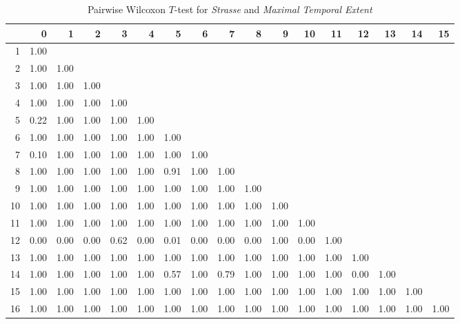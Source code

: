 \begin{table}[ht!]
	\tiny
	\setlength{\tabcolsep}{4pt}
	\centering
  \begin{tabular}{rrrrrrrrrrrrrrrrr}
    \hline
   & 0 & 1 & 2 & 3 & 4 & 5 & 6 & 7 & 8 & 9 & 10 & 11 & 12 & 13 & 14 & 15 \\ 
    \hline
  1 & 1.00 &  &  &  &  &  &  &  &  &  &  &  &  &  &  &  \\ 
    2 & 1.00 & 1.00 &  &  &  &  &  &  &  &  &  &  &  &  &  &  \\ 
    3 & 1.00 & 1.00 & 1.00 &  &  &  &  &  &  &  &  &  &  &  &  &  \\ 
    4 & 1.00 & 1.00 & 1.00 & 1.00 &  &  &  &  &  &  &  &  &  &  &  &  \\ 
    5 & 0.22 & 1.00 & 1.00 & 1.00 & 1.00 &  &  &  &  &  &  &  &  &  &  &  \\ 
    6 & 1.00 & 1.00 & 1.00 & 1.00 & 1.00 & 1.00 &  &  &  &  &  &  &  &  &  &  \\ 
    7 & 0.10 & 1.00 & 1.00 & 1.00 & 1.00 & 1.00 & 1.00 &  &  &  &  &  &  &  &  &  \\ 
    8 & 1.00 & 1.00 & 1.00 & 1.00 & 1.00 & 0.91 & 1.00 & 1.00 &  &  &  &  &  &  &  &  \\ 
    9 & 1.00 & 1.00 & 1.00 & 1.00 & 1.00 & 1.00 & 1.00 & 1.00 & 1.00 &  &  &  &  &  &  &  \\ 
    10 & 1.00 & 1.00 & 1.00 & 1.00 & 1.00 & 1.00 & 1.00 & 1.00 & 1.00 & 1.00 &  &  &  &  &  &  \\ 
    11 & 1.00 & 1.00 & 1.00 & 1.00 & 1.00 & 1.00 & 1.00 & 1.00 & 1.00 & 1.00 & 1.00 &  &  &  &  &  \\ 
    12 & 0.00 & 0.00 & 0.00 & 0.62 & 0.00 & 0.01 & 0.00 & 0.00 & 0.00 & 1.00 & 0.00 & 1.00 &  &  &  &  \\ 
    13 & 1.00 & 1.00 & 1.00 & 1.00 & 1.00 & 1.00 & 1.00 & 1.00 & 1.00 & 1.00 & 1.00 & 1.00 & 1.00 &  &  &  \\ 
    14 & 1.00 & 1.00 & 1.00 & 1.00 & 1.00 & 0.57 & 1.00 & 0.79 & 1.00 & 1.00 & 1.00 & 1.00 & 0.00 & 1.00 &  &  \\ 
    15 & 1.00 & 1.00 & 1.00 & 1.00 & 1.00 & 1.00 & 1.00 & 1.00 & 1.00 & 1.00 & 1.00 & 1.00 & 1.00 & 1.00 & 1.00 &  \\ 
    16 & 1.00 & 1.00 & 1.00 & 1.00 & 1.00 & 1.00 & 1.00 & 1.00 & 1.00 & 1.00 & 1.00 & 1.00 & 1.00 & 1.00 & 1.00 & 1.00 \\ 
     \hline
  \end{tabular}
	\caption{Pairwise Wilcoxon $T$-test for \textit{Strasse} and \textit{Maximal Temporal Extent}}
	\label{tbl:wilcoxon_baysis_matched_Strasse_TMax}
\end{table}
